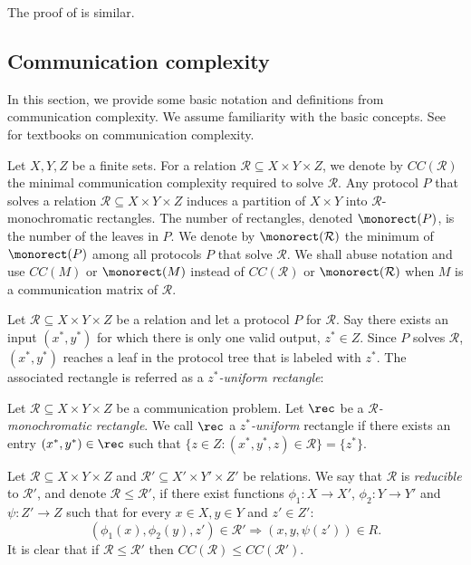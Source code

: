 \documentclass[acmsmall, nonacm, authorversion]{acmart}
\begin{document}
The proof of  is similar.

\subsection{Communication complexity}\label{section:communication-complexity}
In this section, we provide some basic notation and definitions from communication complexity. We assume familiarity with the basic concepts.
See \cite{KN97,RY20} for textbooks on communication complexity. 

Let $X,Y,Z$ be a finite sets. For a relation $\mathcal{R} \subseteq X \times Y \times Z$, we denote by $CC(\mathcal{R})$ the minimal communication complexity required to solve $\mathcal{R}$. 
Any protocol $P$ that solves a relation $\mathcal{R} \subseteq X \times Y \times Z$ induces a partition of $X \times Y$ into $\mathcal{R}$-monochromatic rectangles. The number of rectangles, denoted $\monorect(P)$, is the number of the leaves in $P$. We denote by $\monorect({\mathcal{R}})$ the minimum of $\monorect({P})$ among all protocols $P$ that solve $\mathcal{R}$. 
We shall abuse notation and use $CC(M)$ or $\monorect(M)$ instead of $CC({\mathcal{R}})$ or $\monorect({\mathcal{R}})$ when $M$ is a communication matrix of $\mathcal{R}$.

Let $\mathcal{R} \subseteq X \times Y \times Z$ be a relation and let a protocol $P$ for $\mathcal{R}$. Say there exists an input $(x^*, y^*)$ for which there is only one valid output, $z^* \in Z$. Since $P$ solves $\mathcal{R}$,  $(x^*,y^*)$ reaches a leaf in the protocol tree that is labeled with $z^*$. The associated rectangle is referred as a \emph{$z^*$-uniform rectangle}:

\begin{definition}\label{def:d-colored-combinatorial-rec}
Let $\mathcal{R}\subseteq X\times Y \times Z$ be a communication problem. Let $\rec$ be a \emph{$\mathcal{R}$-monochromatic rectangle}. We call $\rec$ a \emph{$z^*$-uniform} rectangle if there exists an entry $(x^*,y^*)\in \rec$ such that $\{z\in Z: (x^*,y^*,z)\in \mathcal{R}\}=\{z^*\}$.
\end{definition}

Let $\mathcal{R}\subseteq X\times Y \times Z$ and $\mathcal{R}'\subseteq X'\times Y'\times Z'$ be relations. We say that $\mathcal{R}$ is \emph{reducible} to $\mathcal{R}'$, and denote $\mathcal{R}\le \mathcal{R}'$, if there exist functions $\phi_1:X\rightarrow X'$, $\phi_2:Y\rightarrow Y'$ and $\psi:Z'\rightarrow Z$ such that for every $x\in X,y\in Y$ and $z'\in Z'$:
\[
(\phi_1(x),\phi_2(y),z')\in \mathcal{R}'\Rightarrow(x,y,\psi(z'))\in R.
\]
It is clear that if $\mathcal{R}\le \mathcal{R}'$ then $CC(\mathcal{R})\le CC(\mathcal{R}')$.
\end{document}
